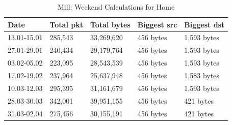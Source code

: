 \begin{table}[H]
    \centering
    \caption{Mill: Weekend Calculations for Home}
    \begin{tabular}{|l|l|l|l|l|}
        \hline
        \textbf{Date}    & \textbf{Total pkt} & \textbf{Total bytes} & \textbf{Biggest src} & \textbf{Biggest dst} \\ \hline
        13.01-15.01      & 285,543            & 33,269,620           & 456 bytes            & 1,593 bytes          \\ \hline
        27.01-29.01      & 240,434            & 29,179,764           & 456 bytes            & 1,593 bytes          \\ \hline
        03.02-05.02      & 223,095            & 28,543,539           & 456 bytes            & 1,593 bytes          \\ \hline
        17.02-19.02      & 237,964            & 25,637,948           & 456 bytes            & 1,583 bytes          \\ \hline
        10.03-12.03      & 295,395            & 31,161,679           & 456 bytes            & 1,593 bytes          \\ \hline
        28.03-30.03      & 342,001            & 39,951,155           & 456 bytes            & 421 bytes            \\ \hline
        31.03-02.04      & 275,456            & 30,155,191           & 456 bytes            & 421 bytes            \\ \hline
    \end{tabular}
    \label{tab:MillHomeWeekends}
\end{table}

